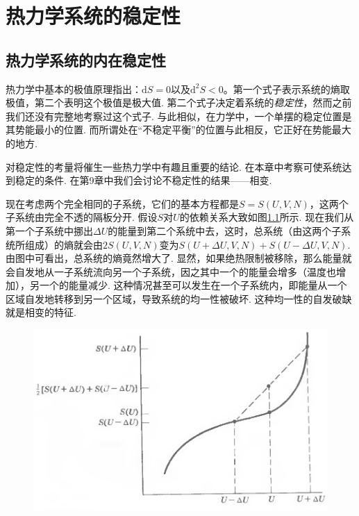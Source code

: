 

\chapter{热力学系统的稳定性}
\label{chap8}
\section{热力学系统的内在稳定性}
\label{sec8.1}
热力学中基本的极值原理指出：$\text{d}S=0$以及$\text{d}^2S<0$。第一个式子表示系统的熵取极值，第二个表明这个极值是极大值. 第二个式子决定着系统的{\it 稳定性}，然而之前我们还没有完整地考察过这个式子. 与此相似，在力学中，一个单摆的稳定位置是其势能最小的位置. 而所谓处在“不稳定平衡”的位置与此相反，它正好在势能最大的地方.

对稳定性的考量将催生一些热力学中有趣且重要的结论. 在本章中考察可使系统达到稳定的条件. 在第9章中我们会讨论不稳定性的结果——相变.

现在考虑两个完全相同的子系统，它们的基本方程都是$S=S(U,V,N)$，这两个子系统由完全不透的隔板分开. 假设$S$对$U$的依赖关系大致如图\ref{fig8.1}所示. 现在我们从第一个子系统中挪出$\Delta U$的能量到第二个系统中去，这时，总系统（由这两个子系统所组成）的熵就会由$2S(U,V,N)$变为$S(U+\Delta　U,V,N)+S(U-\Delta U,V,N)$. 由图中可看出，总系统的熵竟然增大了. 显然，如果绝热限制被移除，那么能量就会自发地从一子系统流向另一个子系统，因之其中一个的能量会增多（温度也增加），另一个的能量减少. 这种情况甚至可以发生在一个子系统内，即能量从一个区域自发地转移到另一个区域，导致系统的均一性被破坏. 这种均一性的自发破缺就是相变的特征.

\begin{figure}
\centering
\includegraphics[width=\textwidth]{Pictures/fig8.1.png}
\label{fig8.1}
\end{figure}

